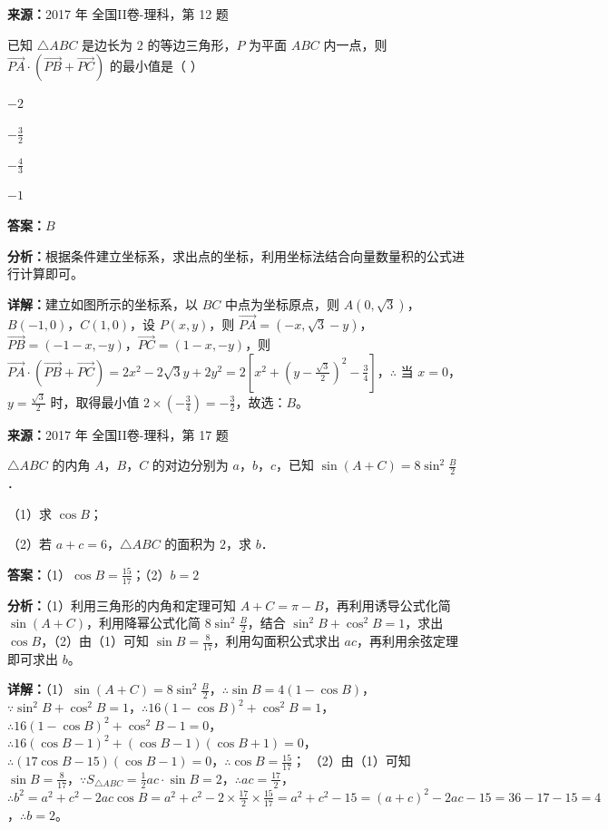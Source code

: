 \begin{question}[points=5]
\textbf{来源：}2017 年 全国II卷-理科，第 12 题\par
已知 $\triangle ABC$ 是边长为 $2$ 的等边三角形，$P$ 为平面 $ABC$ 内一点，则 $\overrightarrow{PA}\cdot(\overrightarrow{PB}+\overrightarrow{PC})$ 的最小值是（   ）
\begin{choices}
  \item $-2$
  \item $-\frac{3}{2}$
  \item $-\frac{4}{3}$
  \item $-1$
\end{choices}
\begin{solution}
\textbf{答案：}$B$

\textbf{分析：}根据条件建立坐标系，求出点的坐标，利用坐标法结合向量数量积的公式进行计算即可。

\textbf{详解：}建立如图所示的坐标系，以 $BC$ 中点为坐标原点，则 $A(0,\sqrt{3})$，$B(-1,0)$，$C(1,0)$，设 $P(x,y)$，则 $\overrightarrow{PA}=(-x,\sqrt{3}-y)$，$\overrightarrow{PB}=(-1-x,-y)$，$\overrightarrow{PC}=(1-x,-y)$，则 $\overrightarrow{PA}\cdot(\overrightarrow{PB}+\overrightarrow{PC})=2x^2-2\sqrt{3}y+2y^2=2[x^2+(y-\frac{\sqrt{3}}{2})^2-\frac{3}{4}]$，$\therefore$ 当 $x=0$，$y=\frac{\sqrt{3}}{2}$ 时，取得最小值 $2\times(-\frac{3}{4})=-\frac{3}{2}$，故选：$B$。
\end{solution}
\end{question}

\begin{question}[points=12]
\textbf{来源：}2017 年 全国II卷-理科，第 17 题\par
$\triangle ABC$ 的内角 $A$，$B$，$C$ 的对边分别为 $a$，$b$，$c$，已知 $\sin(A+C)=8\sin^2\frac{B}{2}$．

（1）求 $\cos B$；

（2）若 $a+c=6$，$\triangle ABC$ 的面积为 $2$，求 $b$．
\begin{solution}
\textbf{答案：}（1）$\cos B=\frac{15}{17}$；（2）$b=2$

\textbf{分析：}（1）利用三角形的内角和定理可知 $A+C=\pi-B$，再利用诱导公式化简 $\sin(A+C)$，利用降幂公式化简 $8\sin^2\frac{B}{2}$，结合 $\sin^2B+\cos^2B=1$，求出 $\cos B$，（2）由（1）可知 $\sin B=\frac{8}{17}$，利用勾面积公式求出 $ac$，再利用余弦定理即可求出 $b$。

\textbf{详解：}（1）$\sin(A+C)=8\sin^2\frac{B}{2}$，$\therefore\sin B=4(1-\cos B)$，$\because\sin^2B+\cos^2B=1$，$\therefore16(1-\cos B)^2+\cos^2B=1$，$\therefore16(1-\cos B)^2+\cos^2B-1=0$，$\therefore16(\cos B-1)^2+(\cos B-1)(\cos B+1)=0$，$\therefore(17\cos B-15)(\cos B-1)=0$，$\therefore\cos B=\frac{15}{17}$；
（2）由（1）可知 $\sin B=\frac{8}{17}$，$\because S_{\triangle ABC}=\frac{1}{2}ac\cdot\sin B=2$，$\therefore ac=\frac{17}{2}$，$\therefore b^2=a^2+c^2-2ac\cos B=a^2+c^2-2\times\frac{17}{2}\times\frac{15}{17}=a^2+c^2-15=(a+c)^2-2ac-15=36-17-15=4$，$\therefore b=2$。
\end{solution}
\end{question}

